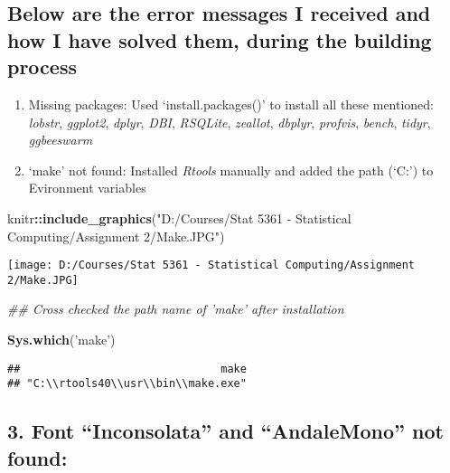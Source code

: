 \documentclass[
]{article}
\newenvironment{Shaded}{\begin{snugshade}}{\end{snugshade}}
\newcommand{\CommentTok}[1]{\textcolor[rgb]{0.56,0.35,0.01}{\textit{#1}}}
\newcommand{\KeywordTok}[1]{\textcolor[rgb]{0.13,0.29,0.53}{\textbf{#1}}}
\newcommand{\NormalTok}[1]{#1}
\newcommand{\OperatorTok}[1]{\textcolor[rgb]{0.81,0.36,0.00}{\textbf{#1}}}
\newcommand{\StringTok}[1]{\textcolor[rgb]{0.31,0.60,0.02}{#1}}
\begin{document}
\hypertarget{below-are-the-error-messages-i-received-and-how-i-have-solved-them-during-the-building-process}{%
\subsection{Below are the error messages I received and how I have
solved them, during the building
process}\label{below-are-the-error-messages-i-received-and-how-i-have-solved-them-during-the-building-process}}

\begin{enumerate}
\def\labelenumi{\arabic{enumi}.}
\item
  Missing packages: Used `install.packages()' to install all these
  mentioned: \emph{lobstr}, \emph{ggplot2}, \emph{dplyr}, \emph{DBI},
  \emph{RSQLite}, \emph{zeallot}, \emph{dbplyr}, \emph{profvis},
  \emph{bench}, \emph{tidyr}, \emph{ggbeeswarm}
\item
  `make' not found: Installed \emph{Rtools} manually and added the path
  (`C:\usr\bin') to Evironment variables
\end{enumerate}

\begin{Shaded}
\begin{Highlighting}[]
\NormalTok{knitr}\OperatorTok{::}\KeywordTok{include_graphics}\NormalTok{(}\StringTok{"D:/Courses/Stat 5361 - Statistical Computing/Assignment 2/Make.JPG"}\NormalTok{)}
\end{Highlighting}
\end{Shaded}

\texttt{[image: D:/Courses/Stat 5361 - Statistical Computing/Assignment 2/Make.JPG]}

\begin{Shaded}
\begin{Highlighting}[]
\CommentTok{## Cross checked the path name of 'make' after installation}

\KeywordTok{Sys.which}\NormalTok{(}\StringTok{'make'}\NormalTok{)}
\end{Highlighting}
\end{Shaded}

\begin{verbatim}
##                               make 
## "C:\\rtools40\\usr\\bin\\make.exe"
\end{verbatim}

\hypertarget{font-inconsolata-and-andalemono-not-found}{%
\subsection{3. Font ``Inconsolata'' and ``AndaleMono'' not
found:}\label{font-inconsolata-and-andalemono-not-found}}
\end{document}
